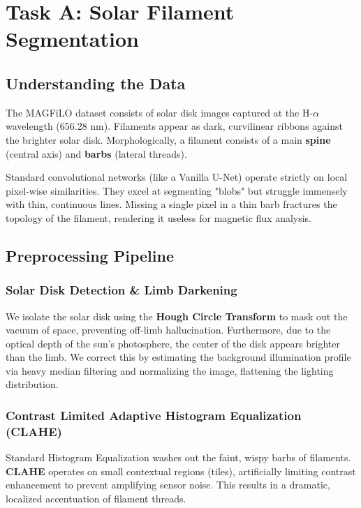 \documentclass[12pt,a4paper]{article}
\begin{document}
\section{Task A: Solar Filament Segmentation}

\subsection{Understanding the Data}
The MAGFiLO dataset consists of solar disk images captured at the H-$\alpha$ wavelength (656.28 nm). Filaments appear as dark, curvilinear ribbons against the brighter solar disk. Morphologically, a filament consists of a main \textbf{spine} (central axis) and \textbf{barbs} (lateral threads). 

\begin{KeyTakeaway}
Standard convolutional networks (like a Vanilla U-Net) operate strictly on local pixel-wise similarities. They excel at segmenting "blobs" but struggle immensely with thin, continuous lines. Missing a single pixel in a thin barb fractures the topology of the filament, rendering it useless for magnetic flux analysis.
\end{KeyTakeaway}

\subsection{Preprocessing Pipeline}
\subsubsection{Solar Disk Detection \& Limb Darkening}
We isolate the solar disk using the \textbf{Hough Circle Transform} to mask out the vacuum of space, preventing off-limb hallucination. Furthermore, due to the optical depth of the sun's photosphere, the center of the disk appears brighter than the limb. We correct this by estimating the background illumination profile via heavy median filtering and normalizing the image, flattening the lighting distribution.

\subsubsection{Contrast Limited Adaptive Histogram Equalization (CLAHE)}
Standard Histogram Equalization washes out the faint, wispy barbs of filaments. \textbf{CLAHE} operates on small contextual regions (tiles), artificially limiting contrast enhancement to prevent amplifying sensor noise. This results in a dramatic, localized accentuation of filament threads.
\end{document}
